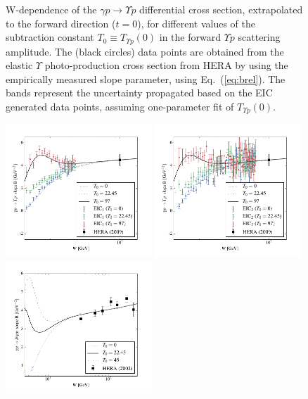 \documentclass[10pt,prd,aps,nofootinbib,superscriptaddress]{revtex4}
\begin{document}
\begin{figure}
\caption{W-dependence of the $\gamma p \to \Upsilon p$ differential cross section, extrapolated to the forward direction ($t=0$), 
for different values of the subtraction constant $T_0 \equiv T_{\Upsilon p} (0)$ in the forward $\Upsilon p$ scattering amplitude. The (black circles) data points are obtained from the elastic $\Upsilon$ photo-production cross section from HERA by using the empirically measured slope parameter, using Eq.~(\ref{eq:brel}). The bands represent the uncertainty propagated based on the EIC generated data points, assuming one-parameter fit of $T_{\Upsilon p}(0)$.}
\label{fig:dsigmadt0}
\end{figure}


\begin{figure}
\includegraphics[width=0.49\textwidth]{b_slope_eic1.pdf}
\includegraphics[width=0.49\textwidth]{b_slope_eic2.pdf}
\includegraphics[width=0.49\textwidth]{b_slope_jpsi.pdf}

\end{figure}
\end{document}
